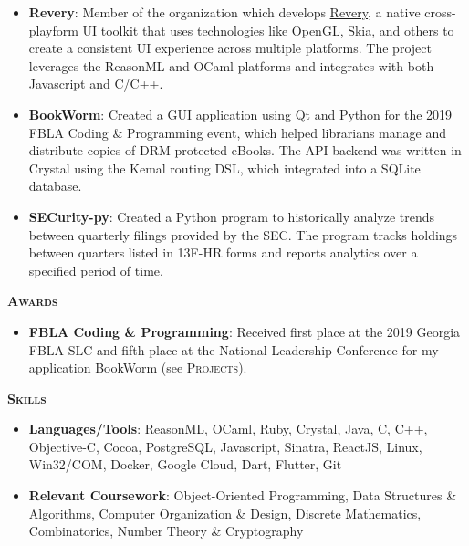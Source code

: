 \documentclass{article}
\newcommand{\sectionHeader}[1]{{\large \textbf{\textsc{#1}}}\hspace{5pt}\xrfill[.5ex]{.4pt}}
\begin{document}
  \begin{itemize}
    \item \textbf{Revery}: Member of the organization which develops \href{https://github.com/revery-ui/revery}{Revery}, a native cross-playform UI toolkit that uses technologies like OpenGL, Skia, and others to create a consistent UI experience across multiple platforms. The project leverages the ReasonML and OCaml platforms and integrates with both Javascript and C/C++.
    \item \textbf{BookWorm}: Created a GUI application using Qt and Python for the 2019 FBLA Coding \& Programming event, which helped librarians manage and distribute copies of DRM-protected eBooks. The API backend was written in Crystal using the Kemal routing DSL, which integrated into a SQLite database.
    \item \textbf{SECurity-py}: Created a Python program to historically analyze trends between quarterly filings provided by the SEC. The program tracks holdings between quarters listed in 13F-HR forms and reports analytics over a specified period of time.
  \end{itemize}

  \vspace{8pt}

  \sectionHeader{Awards}

  \vspace{3pt}

  \begin{itemize}
    \item \textbf{FBLA Coding \& Programming}: Received first place at the 2019 Georgia FBLA SLC and fifth place at the National Leadership Conference for my application BookWorm (see \textsc{Projects}).
  \end{itemize}

  \vspace{8pt}

  \sectionHeader{Skills}
  \begin{itemize}
    \item \textbf{Languages/Tools}: ReasonML, OCaml, Ruby, Crystal, Java, C, C++, Objective-C, Cocoa, PostgreSQL, Javascript, Sinatra, ReactJS, Linux, Win32/COM, Docker, Google Cloud, Dart, Flutter, Git
    \item \textbf{Relevant Coursework}: Object-Oriented Programming, Data Structures \& Algorithms, Computer Organization \& Design, Discrete Mathematics, Combinatorics, Number Theory \& Cryptography
  \end{itemize}
\end{document}

